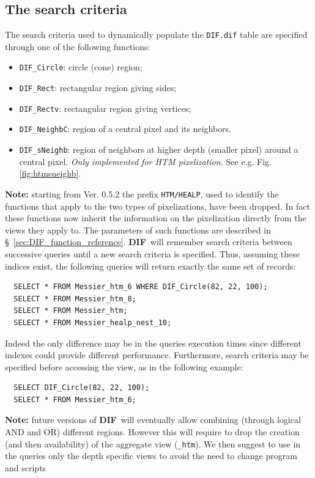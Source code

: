 \documentclass[10pt,titlepage]{article}
\newcommand{\dif}{\textbf{\small DIF}}
\begin{document}
\subsection{The search criteria}
The search criteria used to dynamically populate the {\tt DIF.dif}
table are specified through one of the following functions:
\begin{itemize}
\item {\tt DIF\_Circle}: circle (cone) region;
\item {\tt DIF\_Rect}: rectangular region giving sides;
\item {\tt DIF\_Rectv}: rectangular region giving vertices;
\item {\tt DIF\_NeighbC}: region of a central pixel and its neighbors.
\item {\tt DIF\_sNeighb}: region of neighbors at higher depth (smaller pixel) around
a central pixel. \emph{Only implemented for HTM pixelization.} See e.g. Fig. \ref{fig:htmsneighb}.
\end{itemize}
\textbf{Note:} starting from Ver. 0.5.2 the prefix {\tt HTM/HEALP}, used to
identify the functions that apply to the two types of pixelizations, have
been dropped. In fact these functions now inherit the information on the
pixelization directly from the views they apply to.
The parameters of such functions are described in
\S\ \ref{sec:DIF_function_reference}. \dif\ will remember search
criteria between successive queries until a new search criteria is
specified. Thus, assuming these indices exist, the following queries will
return exactly the same set of records:
\begin{verbatim}
  SELECT * FROM Messier_htm_6 WHERE DIF_Circle(82, 22, 100);
  SELECT * FROM Messier_htm_8;
  SELECT * FROM Messier_htm;
  SELECT * FROM Messier_healp_nest_10;
\end{verbatim}
Indeed the only difference may be in the queries execution times since
different indexes could provide different performance. Furthermore, search
criteria may be specified before accessing the view, as in the
following example:
\begin{verbatim}
  SELECT DIF_Circle(82, 22, 100);
  SELECT * FROM Messier_htm_6;
\end{verbatim}
%
\textbf{Note:} future versions of
\dif\ will eventually allow combining (through logical AND and OR) different
regions. However this will require to drop the creation (and then availability)
of the aggregate view ({\tt \_htm}). We then suggest to use in the queries
only the depth specific views to avoid the need to change program and scripts
\end{document}
